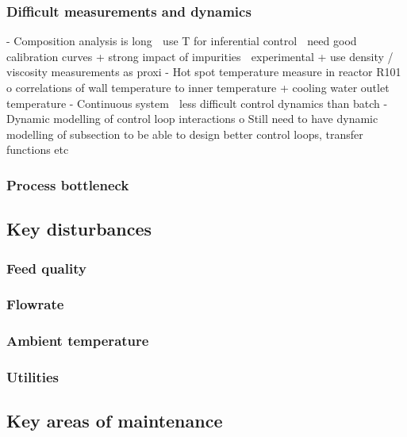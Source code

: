 \subsubsection{Difficult measurements and dynamics} %
-	Composition analysis is long  use T for inferential control  need good calibration curves  + strong impact of impurities  experimental + use density / viscosity measurements as proxi %
-	Hot spot temperature measure in reactor R101 
o	correlations of wall temperature to inner temperature + cooling water outlet temperature 
-	Continuous system  less difficult control dynamics than batch 
-	Dynamic modelling of control loop interactions
o	Still need to have dynamic modelling of subsection to be able to design better control loops, transfer functions etc

\subsubsection{Process bottleneck} %



\subsection{Key disturbances} %

\subsubsection{Feed quality}

\subsubsection{Flowrate}

\subsubsection{Ambient temperature}

\subsubsection{Utilities}


\subsection{Key areas of maintenance} %